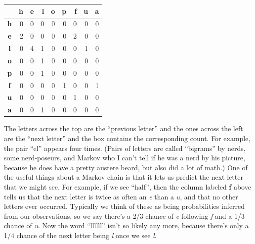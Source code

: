 \documentclass[twocolumn]{article}
\begin{document}

\begin{center}
\begin{tabular}{|c|r|r|r|r|r|r|r|r|} %
\hline
\,  &  {\bf h}   & {\bf e}   & {\bf l}   & {\bf o}   & {\bf p}   & {\bf f}   & {\bf u}   & {\bf a} \\
\hline  %
{\bf h}   &  0   & 0   & 0   & 0   & 0   & 0   & 0   & 0    \\
\hline
{\bf e}   &  2   & 0   & 0   & 0   & 0   & 2   & 0   & 0    \\
\hline
{\bf l}   &  0   & 4   & 1   & 0   & 0   & 0   & 1   & 0    \\
\hline
{\bf o}   &  0   & 0   & 1   & 0   & 0   & 0   & 0   & 0    \\
\hline
{\bf p}   &  0   & 0   & 1   & 0   & 0   & 0   & 0   & 0    \\
\hline
{\bf f}   &  0   & 0   & 0   & 0   & 1   & 0   & 0   & 1    \\
\hline
{\bf u}   &  0   & 0   & 0   & 0   & 0   & 1   & 0   & 0    \\
\hline
{\bf a}   &  0   & 0   & 1   & 0   & 0   & 0   & 0   & 0    \\
\hline
\end{tabular}
\end{center}

The letters across the top are the ``previous letter'' and the ones
across the left are the ``next letter'' and the box contains the
corresponding count. For example, the pair ``el'' appears four times.
(Pairs of letters are called ``bigrams'' by nerds, some nerd-poseurs,
and Markov who I can't tell if he was a nerd by his picture, because
he does have a pretty austere beard, but also did a lot of math.) One
of the useful things about a Markov chain is that it lets us predict
the next letter that we might see. For example, if we see ``half'',
then the column labeled {\bf f} above tells us that the next letter is
twice as often an {\it e} than a {\it u}, and that no other letters
ever occurred. Typically we think of these as being probabilities
inferred from our observations, so we say there's a 2/3 chance of {\it
e} following {\it f} and a 1/3 chance of {\it u}. Now the word ``llllll''
isn't so likely any more, because there's only a 1/4 chance of the
next letter being {\it l} once we see {\it l}.
\end{document}
